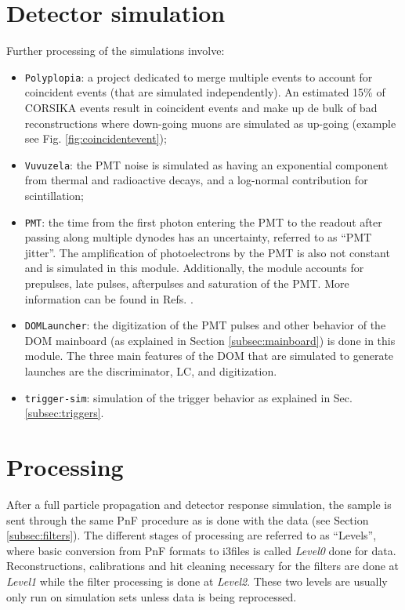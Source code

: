 \section{Detector simulation}
Further processing of the simulations involve:
\begin{itemize}
\item \texttt{Polyplopia}: a project dedicated to merge multiple events to account for coincident events (that are simulated independently). An estimated 15\% of CORSIKA events result in coincident events and make up de bulk of bad reconstructions where down-going muons are simulated as up-going (example see Fig. \ref{fig:coincidentevent});
\item \texttt{Vuvuzela}: the PMT noise is simulated as having an exponential component from  thermal and radioactive decays, and a log-normal contribution for scintillation;
\item \texttt{PMT}: the time from the first photon entering the PMT to the readout after passing along multiple dynodes has an uncertainty, referred to as ``PMT jitter''. The amplification of photoelectrons by the PMT is also not constant and is simulated in this module. Additionally, the module accounts for prepulses, late pulses, afterpulses and saturation of the PMT. More information can be found in Refs. \cite{Abbasi:2010vc,Ma:2009aw}.
\item \texttt{DOMLauncher}: the digitization of the PMT pulses and other behavior of the DOM mainboard (as explained in Section \ref{subsec:mainboard}) is done in this module. The three main features of the DOM that are simulated to generate launches are the discriminator, LC, and digitization.
\item \texttt{trigger-sim}: simulation of the trigger behavior as explained in Sec. \ref{subsec:triggers}.
\end{itemize}

\section{Processing}
\label{sec:processing}
After a full particle propagation and detector response simulation, the sample is sent through the same PnF procedure as is done with the data (see Section \ref{subsec:filters}). The different stages of processing are referred to as ``Levels'', where basic conversion from PnF formats to i3files is called \textit{Level0} done for data. Reconstructions, calibrations and hit cleaning necessary for the filters are done at \textit{Level1} while the filter processing is done at \textit{Level2}. These two levels are usually only run on simulation sets unless data is being reprocessed. 

